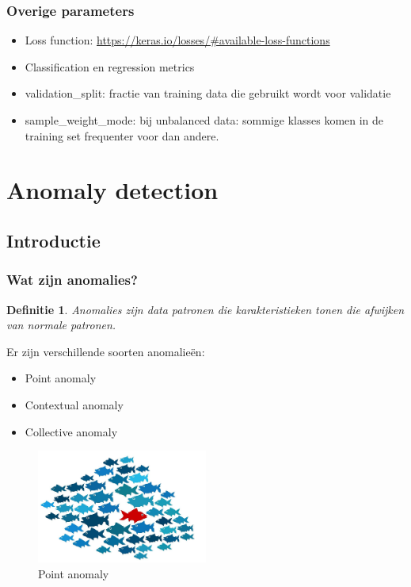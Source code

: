 \documentclass{article}
\newtheorem{theorem}{Definitie}[section]
\begin{document}
\subsubsection{Overige parameters}

\begin{itemize}
    \item Loss function: \url{https://keras.io/losses/#available-loss-functions}
    \item Classification en regression metrics
    \item validation\_split: fractie van training data die gebruikt wordt voor validatie
    \item sample\_weight\_mode: bij unbalanced data: sommige klasses komen in de training set frequenter voor dan andere.
\end{itemize}

\section{Anomaly detection}

\subsection{Introductie}
\subsubsection{Wat zijn anomalies?}

\begin{theorem}
    Anomalies zijn data patronen die karakteristieken tonen
    die afwijken van normale patronen.
\end{theorem}

Er zijn verschillende soorten anomalieën:

\begin{itemize}
    \item Point anomaly
    \item Contextual anomaly
    \item Collective anomaly
\end{itemize}

\begin{figure}[H]
    \centering
    \includegraphics[width=0.5\textwidth]{anomaly-point.png}
    \caption{Point anomaly}
\end{figure}
\end{document}
